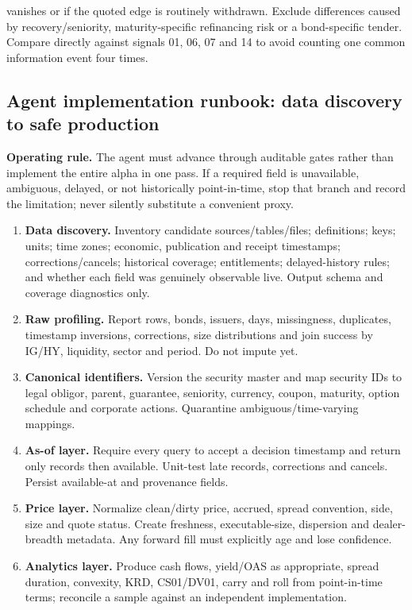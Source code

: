 \documentclass[10pt]{article}
\begin{document}
vanishes or if the quoted edge is routinely withdrawn. Exclude differences caused by recovery/seniority, maturity-specific refinancing risk or a bond-specific tender. Compare directly against signals 01, 06, 07 and 14 to avoid counting one common information event four times.
\subsection{Agent implementation runbook: data discovery to safe production}
\textbf{Operating rule.} The agent must advance through auditable gates rather than implement the entire alpha in one pass. If a required field is unavailable, ambiguous, delayed, or not historically point-in-time, stop that branch and record the limitation; never silently substitute a convenient proxy.
\begin{enumerate}[leftmargin=2em,label=\textbf{A\arabic*.}]
\item \textbf{Data discovery.} Inventory candidate sources/tables/files; definitions; keys; units; time zones; economic, publication and receipt timestamps; corrections/cancels; historical coverage; entitlements; delayed-history rules; and whether each field was genuinely observable live. Output schema and coverage diagnostics only.
\item \textbf{Raw profiling.} Report rows, bonds, issuers, days, missingness, duplicates, timestamp inversions, corrections, size distributions and join success by IG/HY, liquidity, sector and period. Do not impute yet.
\item \textbf{Canonical identifiers.} Version the security master and map security IDs to legal obligor, parent, guarantee, seniority, currency, coupon, maturity, option schedule and corporate actions. Quarantine ambiguous/time-varying mappings.
\item \textbf{As-of layer.} Require every query to accept a decision timestamp and return only records then available. Unit-test late records, corrections and cancels. Persist available-at and provenance fields.
\item \textbf{Price layer.} Normalize clean/dirty price, accrued, spread convention, side, size and quote status. Create freshness, executable-size, dispersion and dealer-breadth metadata. Any forward fill must explicitly age and lose confidence.
\item \textbf{Analytics layer.} Produce cash flows, yield/OAS as appropriate, spread duration, convexity, KRD, CS01/DV01, carry and roll from point-in-time terms; reconcile a sample against an independent implementation.

\end{enumerate}
\end{document}
